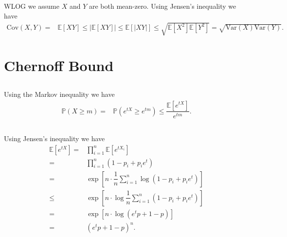 \documentclass[11pt,a4paper]{article}
\numberwithin{equation}{section}%
\begin{document}
\subsection{}

WLOG we assume $ X $ and $ Y $ are both mean-zero. Using Jensen's inequality we have
\begin{align*}
    \mathrm{ Cov }(X,Y)=& \mathbb{E}\left[ XY \right] \leq \left\vert \mathbb{E}\left[ XY \right]  \right\vert   \leq \mathbb{E}\left[ \left\vert XY \right\vert  \right] \leq \sqrt{\mathbb{E}\left[ X^2 \right] \mathbb{E}\left[ Y^2 \right] }= \sqrt{\mathrm{ Var }(X)\mathrm{ Var }(Y)}.
\end{align*}


\section{Chernoff Bound}

\subsection{}

Using the Markov inequality we have
\begin{align*}
    \mathbb{P}\left( X\geq m \right) = & \mathbb{P}\left( e^{tX}\geq e^{tm} \right) \leq \dfrac{ \mathbb{E}\left[ e^{tX} \right] }{e^{tm}}.
\end{align*}

\subsection{}

Using Jensen's inequality we have
\begin{align*}
    \mathbb{E}\left[ e^{tX} \right] =& \prod_{i=1}^n \mathbb{E}\left[ e^{tX_i} \right]\\
    =& \prod_{i=1}^n \left( 1-p_i+p_ie^t \right)\\  
    =&\exp\left[ n\cdot\dfrac{ 1 }{ n }\sum_{i=1}^n \log \left( 1-p_i+p_ie^t \right)  \right]\\
    \leq & \exp\left[ n\cdot \log \dfrac{ 1 }{ n }\sum_{i=1}^n \left( 1-p_i+p_ie^t \right)  \right]\\
    =& \exp\left[ n\cdot \log \left(e^tp+1-p\right)  \right]\\
    =& \left( e^tp+1-p \right)^n.
\end{align*}

\subsection{}
\end{document}
